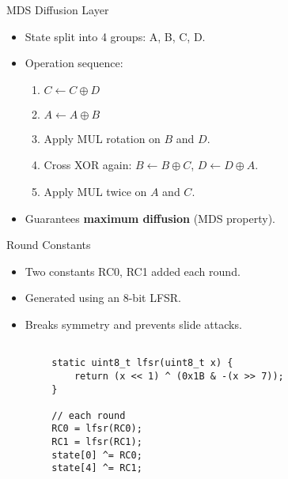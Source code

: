 \begin{frame}{MDS Diffusion Layer}
    \begin{itemize}
        \item State split into 4 groups: A, B, C, D.
        \item Operation sequence:
        \begin{enumerate}
            \item $C \gets C \oplus D$
            \item $A \gets A \oplus B$
            \item Apply MUL rotation on $B$ and $D$.
            \item Cross XOR again: $B \gets B \oplus C$, $D \gets D \oplus A$.
            \item Apply MUL twice on $A$ and $C$.
        \end{enumerate}
        \item Guarantees \textbf{maximum diffusion} (MDS property).
    \end{itemize}
    \end{frame}
            

    \begin{frame}[fragile]{Round Constants}
        \begin{itemize}
            \item Two constants RC0, RC1 added each round.
            \item Generated using an 8-bit LFSR.
            \item Breaks symmetry and prevents slide attacks.
        \end{itemize}
        
        \begin{verbatim}
        
        static uint8_t lfsr(uint8_t x) {
            return (x << 1) ^ (0x1B & -(x >> 7));
        }
        
        // each round
        RC0 = lfsr(RC0);
        RC1 = lfsr(RC1);
        state[0] ^= RC0;
        state[4] ^= RC1;
    \end{verbatim}
        \end{frame}